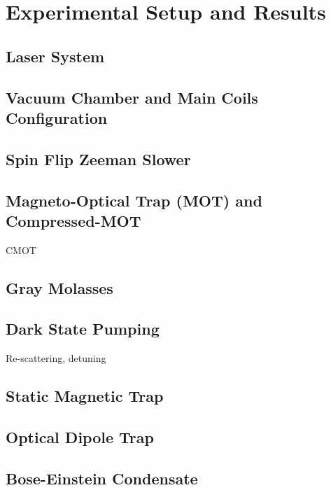 \chapter{Experimental Setup and Results}

\section{Laser System}

\section{Vacuum Chamber and Main Coils Configuration}

\section{Spin Flip Zeeman Slower}

\section{Magneto-Optical Trap (MOT) and Compressed-MOT}

CMOT

\section{Gray Molasses}

\section{Dark State Pumping}

Re-scattering, detuning

\section{Static Magnetic Trap}

\section{Optical Dipole Trap}

\section{Bose-Einstein Condensate}
